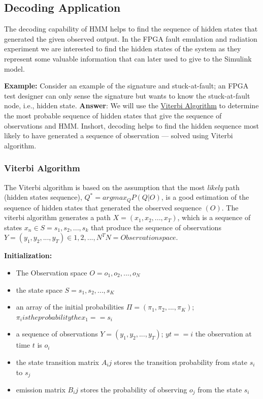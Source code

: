 \subsection{Decoding Application}
The decoding capability of HMM helps to find the sequence of hidden states that generated the given observed output. In the FPGA fault emulation and radiation experiment we are interested to find the hidden states of the system as they represent some valuable information that can later used to give to the Simulink model.
 
\textbf{Example:} Consider an example of the signature and stuck-at-fault; an FPGA test designer can only sense the signature but wants to know the stuck-at-fault node, i.e., hidden state.
\textbf{Answer}: We will use the \underline{Viterbi Algorithm} to determine the most probable sequence of hidden states that give the sequence of observations and HMM. Inshort, decoding helps to find the hidden sequence most likely to have generated a sequence of observation --- solved using Viterbi algorithm.
\subsubsection{Viterbi Algorithm}


The Viterbi algorithm is based on the assumption that the most \textit{likely} path (hidden states sequence), $Q^* = argmax_Q P(Q|O) $, is a good estimation of the sequence of hidden states that generated the observed sequence $(O)$. The viterbi algorithm generates a path $X = (x_1, x_2,...,x_T)$, which is a sequence of states $x_n \in S = {s_1, s_2,...,s_k}$ that produce the sequence of observations $Y = (y_1,y_2,...,y_T) \in {1,2,...,N}^T N = Observation space$.

\textbf{Initialization:}



\begin{itemize}


\item The Observation space $O =  {o_1,o_2,...,o_N}$

\item the state space $S = {s_1,s_2,...,s_K}$

\item an array of the initial probabilities $\Pi = (\pi_1, \pi_2,...,\pi_K)$; $\pi_i is the probability the x_1 == s_i$

\item a sequence of observations $Y = (y_1,y_2,...,y_T)$; $yt == i$ the observation at time $t$ is $o_i$

\item the state transition matrix $A_ij$ stores the transition probability from state $s_i$ to $s_j$


\item emission matrix $B_ij$ stores the probability of observing $o_j$ from the state $s_i$
\end{itemize}  

